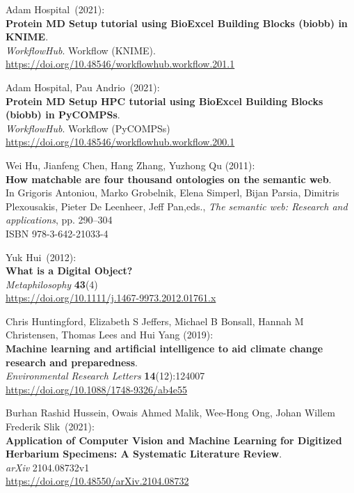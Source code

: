 \begin{thebibliography}{9}
Adam Hospital~(2021):\\
\textbf{Protein MD Setup tutorial using BioExcel Building Blocks (biobb)
in KNIME}.\\
\emph{WorkflowHub}. Workflow (KNIME).\\
\url{https://doi.org/10.48546/workflowhub.workflow.201.1}

Adam Hospital, Pau Andrio~(2021):\\
\textbf{Protein MD Setup HPC tutorial using BioExcel Building Blocks
(biobb) in PyCOMPSs}.\\
\emph{WorkflowHub}. Workflow (PyCOMPSs)\\
\url{https://doi.org/10.48546/workflowhub.workflow.200.1}

Wei Hu, Jianfeng Chen, Hang Zhang, Yuzhong Qu (2011): \\
\textbf{How matchable are four thousand ontologies on the semantic web}. \\
In Grigoris
Antoniou, Marko Grobelnik, Elena Simperl, Bijan Parsia, Dimitris
Plexousakis, Pieter De Leenheer, Jeff Pan,eds., \emph{The semantic
web: {Research} and applications}, pp. 290--304 \\
ISBN 978-3-642-21033-4

Yuk Hui~(2012):\\
\textbf{What is a Digital Object?}\\
\emph{Metaphilosophy} \textbf{43}(4)\\
\url{https://doi.org/10.1111/j.1467-9973.2012.01761.x}

Chris Huntingford, Elizabeth S Jeffers, Michael B Bonsall, Hannah M Christensen, Thomas Lees and Hui Yang (2019):\\
\textbf{Machine learning and artificial intelligence to aid climate change research and preparedness}.\\
\emph{Environmental Research Letters} \textbf{14}(12):124007\\
\url{https://doi.org/10.1088/1748-9326/ab4e55}

Burhan Rashid Hussein, Owais Ahmed Malik, Wee-Hong Ong, Johan Willem Frederik Slik~(2021):\\
\textbf{Application of Computer Vision and Machine Learning for Digitized
Herbarium Specimens: A Systematic Literature Review}.\\
\emph{arXiv} 2104.08732v1\\
\url{https://doi.org/10.48550/arXiv.2104.08732}


\end{thebibliography}
